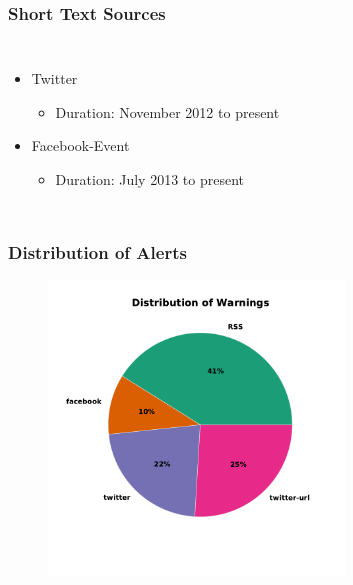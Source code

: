 \documentclass[red,handout]{beamer}
\begin{document}
\begin{frame}
\frametitle{Short Text Sources}
\begin{columns}
    \begin{itemize}
    \item<1->
        Twitter
        \begin{itemize}
            \item<2->
                Duration: November 2012 to present
        \end{itemize}
    \item<3->
        Facebook-Event
        \begin{itemize}
            \item<4->
                Duration: July 2013 to present
        \end{itemize}
    \end{itemize}
    \begin{inparaenum}
        \vspace{2em}
        \vspace{2em}
    \end{inparaenum}
\end{columns}
\end{frame}

\begin{frame}
    \frametitle{Distribution of Alerts}
    \begin{figure}
        \centering
        \includegraphics[width=0.7\textwidth]{warnings_sources}
    \end{figure}
\end{frame}
\end{document}
